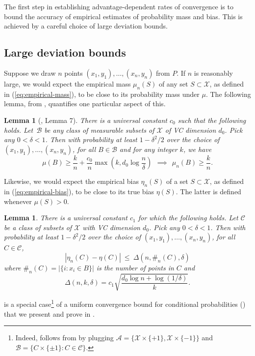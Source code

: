 \documentclass{article}
\def\X{{\mathcal X}}
\def\B{{\mathcal B}}
\newcommand{\cA}{\mathcal{A}}
\newtheorem{lemma}[theorem]{Lemma}
\newcommand{\new}[1]{\color{red} #1}
\begin{document}
The first step in establishing advantage-dependent rates of convergence is to bound the accuracy of empirical estimates of probability mass and bias. This is achieved by a careful choice of large deviation bounds.

\subsection{Large deviation bounds}

Suppose we draw $n$ points $(x_1, y_1), \ldots, (x_n, y_n)$ from $P$. If $n$ is reasonably large, we would expect the empirical mass $\mu_n(S)$ of any set $S \subset \X$, as defined in (\ref{eq:empirical-mass}), to be close to its probability mass under $\mu$. The following lemma, from \cite{ChaudhuriDasgupta2010}, quantifies one particular aspect of this.
\begin{lemma}[\cite{ChaudhuriDasgupta2010}, Lemma 7]
There is a universal constant $c_0$ such that the following holds. Let~$\B$ be any class of measurable subsets of $\X$ of VC dimension $d_0$. Pick any $0 < \delta < 1$. Then with probability at least $1-\delta^2/2$ over the choice of $(x_1, y_1), \ldots, (x_n, y_n)$, for all $B \in \B$ and for any integer $k$, we have
$$ \mu(B) \geq \frac{k}{n} + \frac{c_0}{n} \max \left( k, d_0 \log \frac{n}{\delta} \right)
\ \ \implies \ \ 
\mu_{n}(B) \geq \frac{k}{n} .$$
\label{lemma:points-in-balls}
\end{lemma}

Likewise, we would expect the empirical bias $\eta_n(S)$ of a set $S \subset \X$, as defined in (\ref{eq:empirical-bias}), to be close to its true bias $\eta(S)$. The latter is defined whenever $\mu(S) > 0$.
\begin{lemma}
There is a universal constant $c_1$ for which the following holds. Let $\mathcal{C}$ be a class of subsets of $\X$ with VC dimension $d_0$. Pick any $0 < \delta < 1$. Then with probability at least $1-\delta^2/2$ over the choice of $(x_1, y_1), \ldots, (x_n, y_n)$, for all $C \in \mathcal{C}$,
  $$ \left| \eta_n(C) - \eta(C) \right| \ \leq \ \Delta(n, \#_n(C), \delta) $$
where $\#_n(C) = |\{i: x_i \in B\}|$ is the number of points in $C$ and 
\begin{equation}
\Delta(n,k,\delta) = c_1 \sqrt{\frac{d_0 \log n + \log (1/\delta)}{k}} .
\label{eq:delta-defn}
\end{equation}
\label{lemma:bias}
\end{lemma}

 is a special case\footnote{\new{Indeed,  follows from  
by plugging $\cA = \{\X\times\{+1\}, \X\times\{-1\}\}$ and $\B = \{C\times\{\pm 1\} : C\in\mathcal{C}\}$.}} of a uniform convergence bound for conditional probabilities () 
that we present and prove in \Cref{sec:ucecm}.
\end{document}
